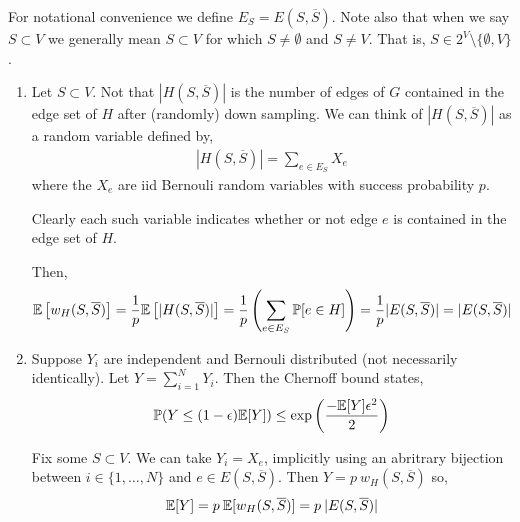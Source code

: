 \documentclass[10pt]{article}
\begin{document}
\begin{solution}[Solution]
    For notational convenience we define \( E_S = E(S,\overline{S}) \). Note also that when we say \( S\subset V \) we generally mean \( S \subset V \) for which \( S\neq \emptyset \) and \( S \neq V \). That is, \( S\in 2^V \setminus \{\emptyset, V\} \).
\begin{enumerate}[label=(\alph*)]
    \item Let \( S \subset V \). 
        Not that \( |H(S,\overline{S})| \) is the number of edges of \( G \) contained in the edge set of \( H \) after (randomly) down sampling.
        We can think of \( |H(S,\overline{S})| \) as a random variable defined by,
        \begin{align*}
            |H(S,\overline{S})| = \sum_{e\in E_S}  X_e
        \end{align*}
        where the \( X_e \) are iid Bernouli random variables with success probability \( p \). 

        Clearly each such variable indicates whether or not edge \( e \) is contained in the edge set of \( H \). 
        
        Then,
        \begin{align*}
            \mathbb{E} \left[w_H(S,\overline{S}) \right] 
            = \frac{1}{p} \mathbb{E} \left[ |H(S,\overline{S})| \right] 
            = \frac{1}{p} \left( \sum_{e\in E_S} \mathbb{P}[e\in H] \right)
            = \frac{1}{p} |E(S,\overline{S})| 
            = |E(S,\overline{S})|
        \end{align*}
    \item 
        Suppose \( Y_i \) are independent and Bernouli distributed (not necessarily identically). %
        Let \(  Y = \sum_{i=1}^{N} Y_i \). Then the Chernoff bound states, 
        \begin{align*}
            \mathbb{P}(Y \leq (1- \epsilon) \mathbb{E}[Y]) \leq \exp \left( \frac{- \mathbb{E}[Y] \epsilon^2}{2} \right)
        \end{align*}
        
       Fix some \( S\subset V \). We can take \( Y_i = X_e \), implicitly using an abritrary bijection between \( i \in\{1,\ldots, N\} \) and \( e\in E(S,\overline{S}) \). Then \( Y = p \: w_H(S,\overline{S}) \) so,
        \begin{align*}
            \mathbb{E}[Y] = p \: \mathbb{E}[w_H(S,\overline{S})] 
            =p \: |E(S,\overline{S})| 
        \end{align*}
        


\end{enumerate}
\end{solution}
\end{document}
